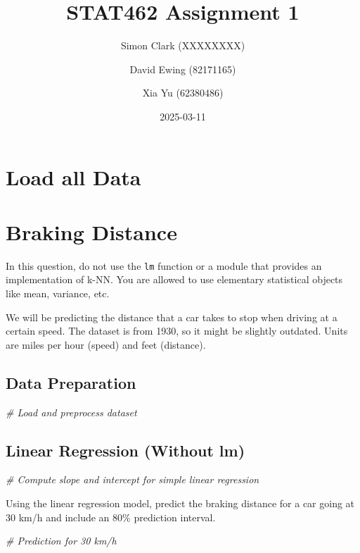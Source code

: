 \documentclass[
]{article}
\title{STAT462 Assignment 1}
\author{Simon Clark (XXXXXXXX) \and David Ewing (82171165) \and Xia Yu
(62380486)}
\date{2025-03-11}
\newenvironment{Shaded}{\begin{snugshade}}{\end{snugshade}}
\newcommand{\CommentTok}[1]{\textcolor[rgb]{0.56,0.35,0.01}{\textit{#1}}}
\begin{document}
\maketitle

\section{Load all Data}\label{load-all-data}

\section{Braking Distance}\label{braking-distance}

In this question, do not use the \texttt{lm} function or a module that
provides an implementation of k-NN. You are allowed to use elementary
statistical objects like mean, variance, etc.

We will be predicting the distance that a car takes to stop when driving
at a certain speed. The dataset is from 1930, so it might be slightly
outdated. Units are miles per hour (speed) and feet (distance).

\subsection{Data Preparation}\label{data-preparation}

\begin{Shaded}
\begin{Highlighting}[]
\CommentTok{\# Load and preprocess dataset}
\end{Highlighting}
\end{Shaded}

\subsection{Linear Regression (Without
lm)}\label{linear-regression-without-lm}

\begin{Shaded}
\begin{Highlighting}[]
\CommentTok{\# Compute slope and intercept for simple linear regression}
\end{Highlighting}
\end{Shaded}

Using the linear regression model, predict the braking distance for a
car going at 30 km/h and include an 80\% prediction interval.

\begin{Shaded}
\begin{Highlighting}[]
\CommentTok{\# Prediction for 30 km/h}
\end{Highlighting}
\end{Shaded}
\end{document}

